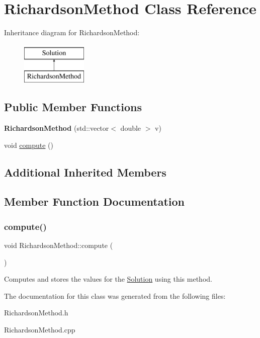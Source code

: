 \hypertarget{class_richardson_method}{}\section{Richardson\+Method Class Reference}
\label{class_richardson_method}
Inheritance diagram for Richardson\+Method\+:\begin{figure}[H]
\begin{center}
\leavevmode
\includegraphics[height=2.000000cm]{class_richardson_method}
\end{center}
\end{figure}
\subsection*{Public Member Functions}
\begin{DoxyCompactItemize}
\item 
\mbox{\label{class_richardson_method_aa97632bc79bc1ef3d048c9ad91e51823}} 
{\bfseries Richardson\+Method} (std\+::vector$<$ double $>$ v)
\item 
void \hyperlink{class_richardson_method_acefe085864b041381f1a7fd3af46d7fb}{compute} ()
\end{DoxyCompactItemize}
\subsection*{Additional Inherited Members}


\subsection{Member Function Documentation}
\mbox{\label{class_richardson_method_acefe085864b041381f1a7fd3af46d7fb}} 
\subsubsection{\texorpdfstring{compute()}{compute()}}
{\footnotesize\ttfamily void Richardson\+Method\+::compute (\begin{DoxyParamCaption}{ }\end{DoxyParamCaption})}

Computes and stores the values for the \hyperlink{class_solution}{Solution} using this method. 

The documentation for this class was generated from the following files\+:\begin{DoxyCompactItemize}
\item 
Richardson\+Method.\+h\item 
Richardson\+Method.\+cpp\end{DoxyCompactItemize}
